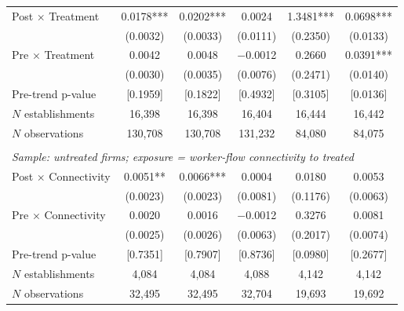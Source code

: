 \begin{table}[!htbp]
\begin{tabular}{lccccc}
Post $\times$ Treatment & 0.0178*** & 0.0202*** & 0.0024 & 1.3481*** & 0.0698***\\
 & (0.0032) & (0.0033) & (0.0111) & (0.2350) & (0.0133)\\
Pre $\times$ Treatment & 0.0042 & 0.0048 & $-$0.0012 & 0.2660 & 0.0391***\\
 & (0.0030) & (0.0035) & (0.0076) & (0.2471) & (0.0140)\\
Pre-trend p-value & [0.1959] & [0.1822] & [0.4932] & [0.3105] & [0.0136]\\
$N$ establishments & 16{,}398 & 16{,}398 & 16{,}404 & 16{,}444 & 16{,}442\\
$N$ observations & 130{,}708 & 130{,}708 & 131{,}232 & 84{,}080 & 84{,}075\\
\addlinespace
\multicolumn{6}{l}{\textbf{Panel D}}\\
\multicolumn{6}{l}{\textit{Sample: untreated firms; exposure = worker-flow connectivity to treated}}\\
Post $\times$ Connectivity & 0.0051** & 0.0066*** & 0.0004 & 0.0180 & 0.0053\\
 & (0.0023) & (0.0023) & (0.0081) & (0.1176) & (0.0063)\\
Pre $\times$ Connectivity & 0.0020 & 0.0016 & $-$0.0012 & 0.3276 & 0.0081\\
 & (0.0025) & (0.0026) & (0.0063) & (0.2017) & (0.0074)\\
Pre-trend p-value & [0.7351] & [0.7907] & [0.8736] & [0.0980] & [0.2677]\\
$N$ establishments & 4{,}084 & 4{,}084 & 4{,}088 & 4{,}142 & 4{,}142\\
$N$ observations & 32{,}495 & 32{,}495 & 32{,}704 & 19{,}693 & 19{,}692\\
\bottomrule
\end{tabular}
\begin{minipage}{\linewidth}
\footnotesize\vspace{4pt}

\end{minipage}
\end{table}
